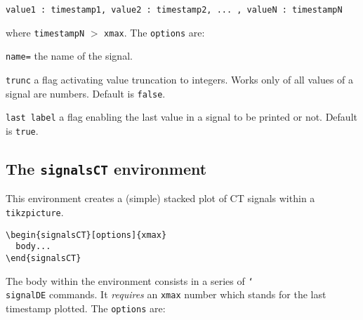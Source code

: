 \begin{verbatim}
value1 : timestamp1, value2 : timestamp2, ... , valueN : timestampN
\end{verbatim}

\noindent where \texttt{timestampN} $>$ \texttt{xmax}. The \texttt{options} are:

\begin{optionslist}
\item \texttt{name=} the name of the signal.
\item \texttt{trunc} a flag activating value truncation to integers. Works only of all values of a signal are numbers. Default is \texttt{false}.
\item \texttt{last label} a flag enabling the last value in a signal to be printed or not. Default is \texttt{true}.
\end{optionslist}


\subsection{The \texttt{signalsCT} environment}
\label{sec:plot-signalsDE}

This environment creates a (simple) stacked plot of CT signals within a \texttt{tikzpicture}.

\begin{verbatim}
\begin{signalsCT}[options]{xmax}
  body...
\end{signalsCT}
\end{verbatim}

The body within the environment consists in a series of \texttt{\char`\\signalDE} commands. It \emph{requires} an \texttt{xmax} number which stands for the last timestamp plotted. The \texttt{options} are:

